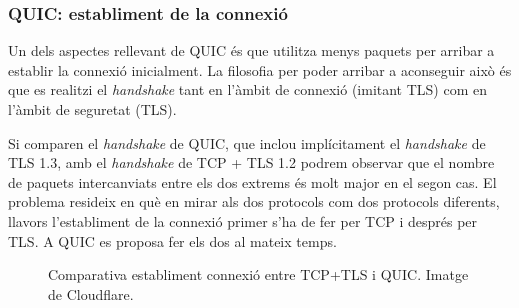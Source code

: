 \subsubsection{QUIC: establiment de la connexió}
{
    Un dels aspectes rellevant de QUIC és que utilitza menys paquets per arribar a establir la connexió inicialment. La filosofia per poder
    arribar a aconseguir això és que es realitzi el \textit{handshake} tant en l'àmbit de connexió (imitant TLS) com en l'àmbit de seguretat (TLS).

    Si comparen el \textit{handshake} de QUIC, que inclou implícitament el \textit{handshake} de TLS 1.3, amb el \textit{handshake} de TCP + TLS 1.2
    podrem observar que el nombre de paquets intercanviats entre els dos extrems és molt major en el segon cas. El problema resideix en què en mirar
    als dos protocols com dos protocols diferents, llavors l'establiment de la connexió primer s'ha de fer per TCP i després per TLS. A QUIC es
    proposa fer els dos al mateix temps.

    \begin{figure}[H]
        \centering
        \qquad
        \caption{Comparativa establiment connexió entre TCP+TLS i QUIC. Imatge de Cloudflare.}
        \label{fig:comparativa_handshakes}%
    \end{figure}
 
}

